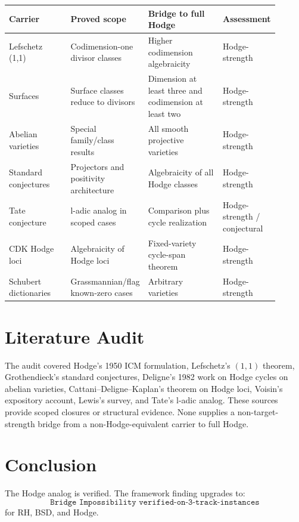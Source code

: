\documentclass{article}
\begin{document}
\begin{center}
\begin{tabular}{p{0.23\linewidth}p{0.27\linewidth}p{0.28\linewidth}p{0.12\linewidth}}
\toprule
Carrier & Proved scope & Bridge to full Hodge & Assessment\\
\midrule
Lefschetz (1,1) & Codimension-one divisor classes & Higher codimension algebraicity & Hodge-strength\\
Surfaces & Surface classes reduce to divisors & Dimension at least three and codimension at least two & Hodge-strength\\
Abelian varieties & Special family/class results & All smooth projective varieties & Hodge-strength\\
Standard conjectures & Projectors and positivity architecture & Algebraicity of all Hodge classes & Hodge-strength\\
Tate conjecture & l-adic analog in scoped cases & Comparison plus cycle realization & Hodge-strength / conjectural\\
CDK Hodge loci & Algebraicity of Hodge loci & Fixed-variety cycle-span theorem & Hodge-strength\\
Schubert dictionaries & Grassmannian/flag known-zero cases & Arbitrary varieties & Hodge-strength\\
\bottomrule
\end{tabular}
\end{center}

\section{Literature Audit}

The audit covered Hodge's 1950 ICM formulation, Lefschetz's \((1,1)\) theorem, Grothendieck's standard conjectures, Deligne's 1982 work on Hodge cycles on abelian varieties, Cattani--Deligne--Kaplan's theorem on Hodge loci, Voisin's expository account, Lewis's survey, and Tate's l-adic analog. These sources provide scoped closures or structural evidence. None supplies a non-target-strength bridge from a non-Hodge-equivalent carrier to full Hodge.

\section{Conclusion}

The Hodge analog is verified. The framework finding upgrades to:
\[
  \texttt{Bridge Impossibility verified-on-3-track-instances}
\]
for RH, BSD, and Hodge.
\end{document}

